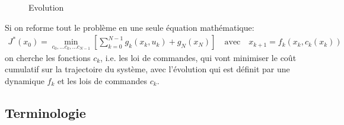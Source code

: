 \begin{figure}[H]
	\centering
	\vspace{-10pt}
		\caption{Evolution}
		\label{fig:evolution}
\end{figure}

Si on reforme tout le problème en une seule équation mathématique:
\begin{align}
    J^*(x_0) = \min_{c_0, ... c_k, ... c_{N-1}} 
    \left[ \sum_{k=0}^{N-1} g_k(x_k, u_k) + g_N( x_N )
    \right] \quad
    \text{avec} \quad
    x_{k+1} = f_k( x_k, c_k(x_k) )
\end{align}
on cherche les fonctions $c_k$, i.e. les loi de commandes, qui vont minimiser le coût cumulatif  sur la trajectoire du système, avec l'évolution qui est définit par une dynamique $f_k$ et les lois de commandes $c_k$.


\newpage
\subsection{Terminologie}

